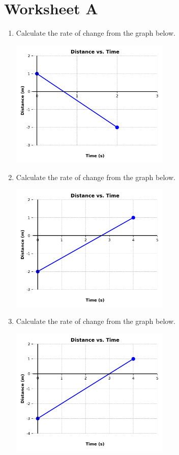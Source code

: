 \documentclass[12pt]{article}
\begin{document}
\section*{Worksheet A}
\begin{enumerate}
\item Calculate the rate of change from the graph below.

\includegraphics[width=0.6\textwidth]{A_problem_1.png}


\vspace{2cm}  %
\item Calculate the rate of change from the graph below.

\includegraphics[width=0.6\textwidth]{A_problem_2.png}


\vspace{2cm}  %
\item Calculate the rate of change from the graph below.

\includegraphics[width=0.6\textwidth]{A_problem_3.png}



\end{enumerate}
\end{document}
